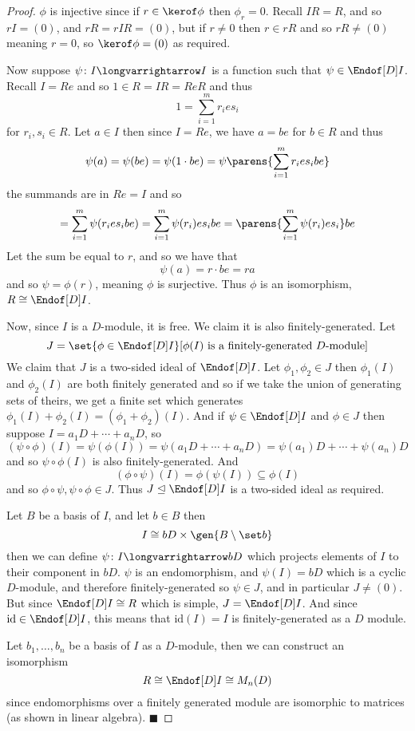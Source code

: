 \documentclass[10pt]{article}
\let\ideal=\trianglelefteq
\let\longto=\longvarrightarrow
\def\qed{%
    \ifmmode%
        \eqno\blacksquare%
    \else%
        \hskip1cm\allowbreak\hbox{}\nobreak\hfill$\blacksquare$%
    \fi%
}
\begin{document}
\begin{proof}
    $\phi$ is injective since if $r\in\kerof\phi$ then $\phi_r=0$.
    Recall $IR=R$, and so $rI=(0)$, and $rR=rIR=(0)$, but if $r\neq0$ then $r\in rR$ and so $rR\neq(0)$ meaning $r=0$, so $\kerof\phi=(0)$ as required.

    Now suppose $\psi\colon I\longto I$ is a function such that $\psi\in\Endof[D]I$.
    Recall $I=Re$ and so $1\in R=IR=ReR$ and thus
    \[ 1 = \sum_{i=1}^m r_ies_i \]
    for $r_i,s_i\in R$.
    Let $a\in I$ then since $I=Re$, we have $a=be$ for $b\in R$ and thus
    \[ \psi(a) = \psi(be) = \psi(1\cdot be) = \psi\parens{\sum_{i=1}^m r_ies_ibe} \]
    the summands are in $Re=I$ and so
    \[ = \sum_{i=1}^m \psi(r_ies_ibe) = \sum_{i=1}^m \psi(r_i)es_ibe = \parens{\sum_{i=1}^m \psi(r_i)es_i}be \]
    Let the sum be equal to $r$, and so we have that
    \[ \psi(a) = r\cdot be = ra \]
    and so $\psi=\phi(r)$, meaning $\phi$ is surjective.
    Thus $\phi$ is an isomorphism, $R\cong\Endof[D]I$.

    Now, since $I$ is a $D$-module, it is free.
    We claim it is also finitely-generated.
    Let
    \[ J = \set{\phi\in\Endof[D]I}[\phi(I)\text{ is a finitely-generated }D\text{-module}] \]
    We claim that $J$ is a two-sided ideal of $\Endof[D]I$.
    Let $\phi_1,\phi_2\in J$ then $\phi_1(I)$ and $\phi_2(I)$ are both finitely generated and so if we take the union of generating sets of theirs, we get a finite set which generates
    $\phi_1(I)+\phi_2(I)=(\phi_1+\phi_2)(I)$.
    And if $\psi\in\Endof[D]I$ and $\phi\in J$ then suppose $I=a_1D+\cdots+a_nD$, so
    \[ (\psi\circ\phi)(I) = \psi(\phi(I)) = \psi(a_1D + \cdots + a_nD) = \psi(a_1)D+\cdots+\psi(a_n)D \]
    and so $\psi\circ\phi(I)$ is also finitely-generated.
    And
    \[ (\phi\circ\psi)(I) = \phi(\psi(I)) \subseteq \phi(I) \]
    and so $\phi\circ\psi,\psi\circ\phi\in J$.
    Thus $J\ideal\Endof[D]I$ is a two-sided ideal as required.

    Let $B$ be a basis of $I$, and let $b\in B$ then
    \[ I \cong bD\times\gen{B\setminus\set b} \]
    then we can define $\psi\colon I\longto bD$ which projects elements of $I$ to their component in $bD$.
    $\psi$ is an endomorphism, and $\psi(I)=bD$ which is a cyclic $D$-module, and therefore finitely-generated so $\psi\in J$, and in particular $J\neq(0)$.
    But since $\Endof[D]I\cong R$ which is simple, $J=\Endof[D]I$.
    And since $\mathrm{id}\in\Endof[D]I$, this means that $\mathrm{id}(I)=I$ is finitely-generated as a $D$ module.

    Let $b_1,\dots,b_n$ be a basis of $I$ as a $D$-module, then we can construct an isomorphism
    \[ R \cong \Endof[D]I \cong M_n(D) \]
    since endomorphisms over a finitely generated module are isomorphic to matrices (as shown in linear algebra).
    \qed

\end{proof}
\end{document}
